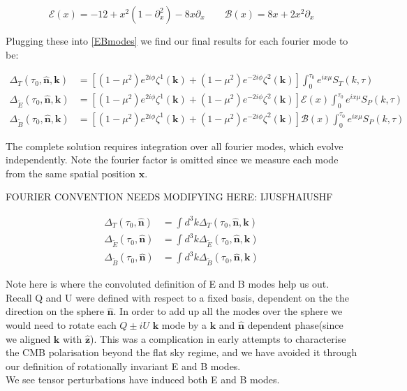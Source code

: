 \documentclass[a4paper,11pt]{article}
\renewcommand{\v}[1]{\mathbf{#1}}
\newcommand{\unit}[1]{\hat{\v{#1}}}
\begin{document}
\begin{equation}
\mathcal{E}(x)=-12+x^2(1-\partial^2_x)-8x\partial_x \qquad \mathcal{B}(x) = 8x+2x^2\partial_x
\end{equation}

Plugging these into \ref{EBmodes} we find our final results for each fourier mode to be:

\begin{align}
\Delta_T(\tau_0,\unit{n},\v{k}) &= [(1-\mu^2) e^{2i\phi} \zeta^1(\v{k})+(1-\mu^2) e^{-2i\phi} \zeta^2(\v{k})]\int_0^{\tau_0} e^{ix\mu}S_T(k,\tau)\\
\Delta_{\tilde{E}}(\tau_0,\unit{n},\v{k}) &= [(1-\mu^2) e^{2i\phi} \zeta^1(\v{k})+(1-\mu^2) e^{-2i\phi} \zeta^2(\v{k})]\mathcal{E}(x)\int_0^{\tau_0} e^{ix\mu}S_P(k,\tau)\\
\Delta_{\tilde{B}}(\tau_0,\unit{n},\v{k}) &= [(1-\mu^2) e^{2i\phi} \zeta^1(\v{k})+(1-\mu^2) e^{-2i\phi} \zeta^2(\v{k})]\mathcal{B}(x)\int_0^{\tau_0} e^{ix\mu}S_P(k,\tau)
\end{align}

The complete solution requires integration over all fourier modes, which evolve independently. Note the fourier factor is omitted since we measure each mode from the same spatial position $\v{x}$.

FOURIER CONVENTION NEEDS MODIFYING HERE: IJUSFHAIUSHF

\begin{align}
\Delta_T(\tau_0,\unit{n}) &= \int d^3k \Delta_T(\tau_0,\unit{n},\v{k})\\
\Delta_{\tilde{E}}(\tau_0,\unit{n}) &= \int d^3k\Delta_{\tilde{E}}(\tau_0,\unit{n},\v{k})\\
\Delta_{\tilde{B}}(\tau_0,\unit{n}) &= \int d^3k\Delta_{\tilde{B}}(\tau_0,\unit{n},\v{k})
\end{align}

Note here is where the convoluted definition of E and B modes help us out. Recall Q and U were defined with respect to a fixed basis, dependent on the the direction on the sphere $\unit{n}$. In order to add up all the modes over the sphere we would need to rotate each $Q\pm iU$ $\v{k}$ mode by a $\v{k}$ and $\unit{n}$ dependent phase(since we aligned $\v{k}$ with $\unit{z}$). This was a complication in early attempts to characterise the CMB polarisation beyond the flat sky regime, and we have avoided it through our definition of rotationally invariant E and B modes.\\

We see tensor perturbations have induced both E and B modes.
\end{document}
